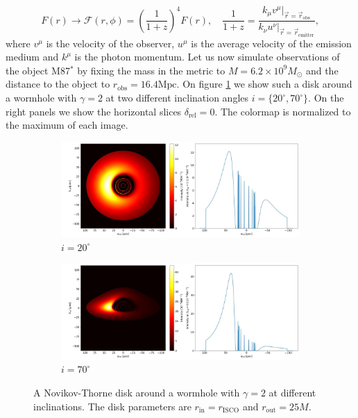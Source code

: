 \documentclass[12pt]{article}
\numberwithin{equation}{section}
\numberwithin{figure}{section}
\begin{document}
	\begin{equation}
		F(r)\rightarrow\mathcal{F}(r,\phi) = \left(\frac{1}{1+z} \right)^4 F(r),\quad \frac{1}{1 + z} = \frac{k_\mu v^\mu\vert_{\vec{r} = \vec{r}_\text{obs}}}{k_\nu u^\nu\vert_{\vec{r} = \vec{r}_\text{emitter}}},
	\end{equation}
	where $v^\mu$ is the velocity of the observer, $u^\mu$ is the average velocity of the emission medium and $k^\mu$ is the photon momentum. Let us now simulate observations of the object M87$^*$ by fixing the mass in the metric to $M = 6.2\times10^9 M_\odot$ and the distance to the object to $r_\text{obs} = 16.4 \text{Mpc}$. On figure \ref{WH_NT} we show such a disk around a wormhole with $\gamma = 2$ at two different inclination angles $i=\{20^\circ, 70^\circ\}$. On the right panels we show the horizontal slices $\delta_\text{rel} = 0$. The colormap is normalized to the maximum of each image.
	
	\newpage
	
	\begin{figure}[!htb]
		\centering
		\begin{subfigure}{12cm}
			\hspace{-0.6cm}
			\includegraphics[scale = 0.4]{Section_6_Morphology_of_the images_of_horizonless_spacetimes/WH_NT_Gamma2_20_deg.jpg}
			\caption{$i = 20^\circ$} 
		\end{subfigure}
		\begin{subfigure}{12cm}
			\hspace{-0.6cm}
			\includegraphics[scale = 0.4]{Section_6_Morphology_of_the images_of_horizonless_spacetimes/WH_NT_Gamma2_70_deg.jpg}
			\caption{$i = 70^\circ$} 
		\end{subfigure}
		\caption[A Novikov-Thorne disk around a wormhole at different inclinations.]{\small A Novikov-Thorne disk around a wormhole with $\gamma = 2$ at different inclinations. The disk parameters are $r_\text{in} = r_\text{ISCO}$ and $r_\text{out} = 25M$.} 
		\label{WH_NT}
	\end{figure}
	
\end{document}
